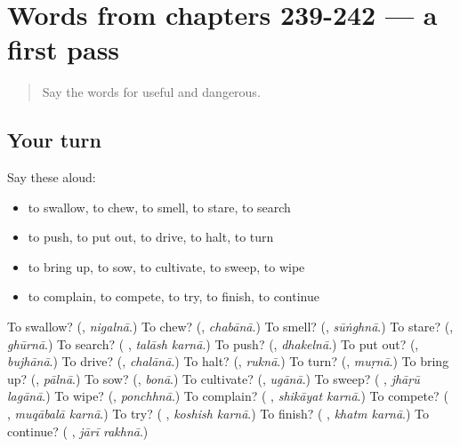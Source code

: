 \section[(dialogue)]{Words from chapters 239-242 — a first pass}

\label{lesson:UR-R247-first-pass-words-from-chapters-239-242}



\begin{quote}
Say the words for useful and dangerous.
\end{quote}

\subsection*{Your turn}
Say these aloud:

\begin{itemize}
\raggedright
  \item to swallow, to chew, to smell, to stare, to search
  \item to push, to put out, to drive, to halt, to turn
  \item to bring up, to sow, to cultivate, to sweep, to wipe
  \item to complain, to compete, to try, to finish, to continue
\end{itemize}

\begin{tcolorbox}[breakable,colback=teal!4,colframe=teal!35!black,title={Before you move on}]
To swallow? (\textbf{}, \emph{nigalnā}.) To chew? (\textbf{}, \emph{chabānā}.) To smell? (\textbf{}, \emph{sūṅghnā}.) To stare? (\textbf{}, \emph{ghūrnā}.) To search? (\textbf{ }, \emph{talāsh karnā}.) To push? (\textbf{}, \emph{dhakelnā}.) To put out? (\textbf{}, \emph{bujhānā}.) To drive? (\textbf{}, \emph{chalānā}.) To halt? (\textbf{}, \emph{ruknā}.) To turn? (\textbf{}, \emph{muṛnā}.) To bring up? (\textbf{}, \emph{pālnā}.) To sow? (\textbf{}, \emph{bonā}.) To cultivate? (\textbf{}, \emph{ugānā}.) To sweep? (\textbf{ }, \emph{jhāṛū lagānā}.) To wipe? (\textbf{}, \emph{ponchhnā}.) To complain? (\textbf{ }, \emph{shikāyat karnā}.) To compete? (\textbf{ }, \emph{muqābalā karnā}.) To try? (\textbf{ }, \emph{koshish karnā}.) To finish? (\textbf{ }, \emph{khatm karnā}.) To continue? (\textbf{ }, \emph{jārī rakhnā}.)
\end{tcolorbox}
